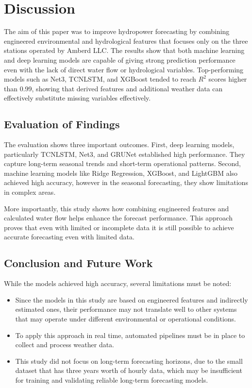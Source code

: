 \documentclass[12pt]{article}
\begin{document}
\section{Discussion}
\label{sec:discussion}

The aim of this paper was to improve hydropower forecasting by combining engineered environmental and hydrological features that focuses only on the three stations operated by Amberd LLC. The results show that both machine learning and deep learning models are capable of giving strong prediction performance even with the lack of direct water flow or hydrological variables. Top-performing models such as Net3, TCNLSTM, and XGBoost tended to reach $R^2$ scores higher than 0.99, showing that derived features and additional weather data can effectively substitute missing variables effectively.

\subsection{Evaluation of Findings}
\label{sec:evaluation}

The evaluation shows three important outcomes. First, deep learning models, particularly TCNLSTM, Net3, and GRUNet established high performance. They capture long-term seasonal trends and short-term operational patterns. Second, machine learning models like Ridge Regression, XGBoost, and LightGBM also achieved high accuracy, however in the seasonal forecasting, they show limitations in complex areas.

More importantly, this study shows how combining engineered features and calculated water flow helps enhance the forecast performance. This approach proves that even with limited or incomplete data it is still possible to achieve accurate forecasting even with limited data.  

\subsection{Conclusion and Future Work}
\label{sec:limitations}
While the models achieved high accuracy, several limitations must be noted:

\begin{itemize}
    \item Since the models in this study are based on engineered features and indirectly estimated ones, their performance may not translate well to other systems that may operate under different environmental or operational conditions. 
    \item To apply this approach in real time, automated pipelines must be in place to collect and process weather data. 
    \item This study did not focus on long-term forecasting horizons, due to the small dataset that has three years worth of hourly data, which may be insufficient for training and validating reliable long-term forecasting models.

\end{itemize}
\end{document}
